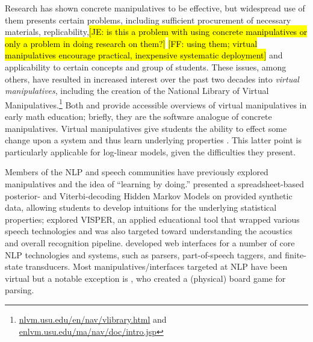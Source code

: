 \documentclass[11pt,letterpaper]{article}
\newcommand{\Note}[1]{}
\renewcommand{\Note}[1]{\hl{[#1]}}  %
\newcommand{\NoteSigned}[3]{{\sethlcolor{#2}\Note{#1: #3}}}
\newcommand{\NoteFF}[1]{\NoteSigned{FF}{LightBlue}{#1}}
\newcommand{\NoteJE}[1]{\NoteSigned{JE}{LightGreen}{#1}}
\newcommand{\Commented}[1]{#1}
\begin{document}
Research has shown concrete manipulatives to be effective, but widespread use of them presents certain 
problems, including sufficient procurement of necessary materials, replicability,\NoteJE{is this a problem
  with using concrete manipulatives or only a problem in doing
  research on them?} \NoteFF{using them; virtual manipulatives encourage practical, inexpensive systematic 
deployment} and applicability to certain concepts and group of students. These issues, among others, have 
resulted in increased interest over the past two decades into \textit{virtual manipulatives}, including the creation of 
the National Library of Virtual Manipulatives.\footnote{\url{nlvm.usu.edu/en/nav/vlibrary.html} and 
\url{enlvm.usu.edu/ma/nav/doc/intro.jsp}} 
Both  and  provide accessible overviews of 
virtual manipulatives in early math education; briefly, they are the software analogue of concrete manipulatives. Virtual manipulatives give students the 
ability to effect some change upon a system and thus learn underlying properties \cite{moyer2002virtual}.
This latter point is particularly applicable for log-linear models, given the difficulties they present.



Members of the NLP and speech communities have previously explored manipulatives and the idea of
``learning by doing.''
 presented a spreadsheet-based posterior- and Viterbi-decoding Hidden Markov Models 
on provided synthetic data, allowing students to develop intuitions for the underlying statistical properties; 
 explored VISPER, an applied educational tool that wrapped various speech technologies and 
was also targeted toward understanding the acoustics and overall recognition pipeline. 
 developed web interfaces for a number of core NLP technologies and systems, such as parsers, part-of-speech 
taggers, and finite-state transducers. 
Most manipulatives/interfaces targeted at NLP have been virtual but a notable exception is , 
who created a (physical) board game for parsing. 
\end{document}
